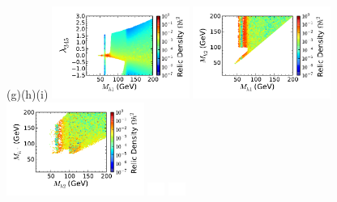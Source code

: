 \documentclass[12pt,a4paper]{article}
\begin{document}
\begin{figure}[htb]
\vskip 0.2cm
\hspace*{1.4cm}(g)\hspace*{0.35\textwidth}\hspace*{-1.5cm}(h)\hspace*{0.35\textwidth}\hspace*{-1.6cm}(i)
\vskip 0.0cm
{\hspace*{-0.3cm}\includegraphics[width=0.4\textwidth]{Mh1_ld345_Omega_small-cut12345678_z.pdf}}%
{\hspace*{-1.55cm}\includegraphics[width=0.4\textwidth]{Mh1_Mh2_Omega_small-cut12345678_z.pdf}}%
{\hspace*{-1.55cm}\includegraphics[width=0.4\textwidth]{Mhc_Mh2_Omega_small-cut12345678_z.pdf}}%
\vskip -5.2cm
\hspace*{4.9cm}\includegraphics[width=0.55cm,height=4.cm]{blank.pdf}%
\hspace*{4.9cm}\includegraphics[width=0.55cm,height=4.cm]{blank.pdf}%

\end{figure}
\end{document}
